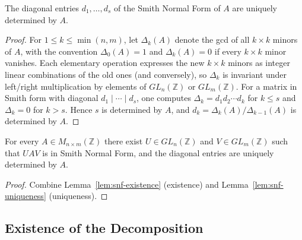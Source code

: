 \begin{lemma}
    \label{lem:snf-uniqueness}
    The diagonal entries $d_1, \dots, d_s$ of the Smith Normal Form of $A$
    are uniquely determined by $A$.
\end{lemma}
\begin{proof}
    For $1 \le k \le \min(n, m)$, let $\Delta_k(A)$ denote the gcd of all
    $k \times k$ minors of $A$, with the convention $\Delta_0(A) = 1$ and
    $\Delta_k(A) = 0$ if every $k \times k$ minor vanishes. Each elementary
    operation expresses the new $k \times k$ minors as integer linear
    combinations of the old ones (and conversely), so $\Delta_k$ is invariant
    under left/right multiplication by elements of $GL_n(\mathbb{Z})$ or $GL_m(\mathbb{Z})$.
    For a matrix in Smith form with diagonal $d_1 \mid \cdots \mid d_s$,
    one computes $\Delta_k = d_1 d_2 \cdots d_k$ for $k \le s$ and
    $\Delta_k = 0$ for $k > s$. Hence $s$ is determined by $A$, and
    $d_k = \Delta_k(A) / \Delta_{k-1}(A)$ is determined by $A$.
\end{proof}

\begin{lemma}
    \label{lem:snf-combined}
    For every $A \in M_{n \times m}(\mathbb{Z})$ there exist $U \in GL_n(\mathbb{Z})$
    and $V \in GL_m(\mathbb{Z})$ such that $U A V$ is in Smith Normal Form, and
    the diagonal entries are uniquely determined by $A$.
\end{lemma}
\begin{proof}
    Combine Lemma~\ref{lem:snf-existence} (existence) and
    Lemma~\ref{lem:snf-uniqueness} (uniqueness).
\end{proof}

\subsection{Existence of the Decomposition}

